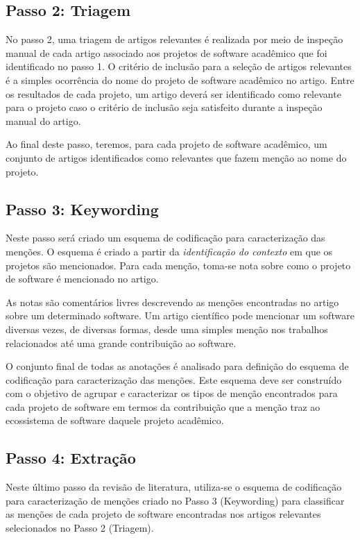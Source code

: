 \subsection{Passo 2: Triagem}

No passo 2, uma triagem de artigos relevantes é realizada por meio 
de inspeção manual de cada artigo associado aos projetos de software acadêmico
que foi identificado no passo 1.
O critério de inclusão para a seleção de artigos relevantes é a simples
ocorrência do nome do projeto de software acadêmico no artigo.
%
Entre os resultados de cada projeto,
um artigo deverá ser identificado como
relevante para o projeto caso o critério de inclusão seja satisfeito durante a
inspeção manual do artigo.

Ao final deste passo, teremos, para cada projeto
de software acadêmico, um conjunto de artigos identificados como relevantes que fazem
menção ao nome do projeto.

\subsection{Passo 3: Keywording}

Neste passo será criado um esquema de codificação para caracterização das
menções. O esquema é criado a partir da \textit{identificação do contexto} em que os
projetos são mencionados. Para cada menção, toma-se nota sobre como o projeto de
software é mencionado no artigo.

As notas são comentários livres descrevendo as menções encontradas no artigo
sobre um determinado software.
Um artigo científico pode mencionar um software
diversas vezes, de diversas formas, desde uma simples menção nos trabalhos
relacionados até uma grande contribuição ao software.

O conjunto final de todas as anotações é analisado
para definição do esquema de codificação para caracterização das menções. 
Este esquema deve ser construído com o objetivo de agrupar e caracterizar os tipos
de menção encontrados para cada projeto de software em termos da contribuição
que a menção traz ao ecossistema de software daquele projeto acadêmico.

\subsection{Passo 4: Extração}

Neste último passo da revisão de literatura, utiliza-se o esquema de codificação
para caracterização de menções criado no Passo 3 (Keywording) para classificar as
menções de cada projeto de software encontradas nos artigos relevantes
selecionados no Passo 2 (Triagem).

